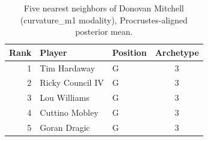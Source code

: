 \begin{table}[htbp]
  \centering\small
  \begin{tabular}{rllc}
    \toprule
    Rank & Player & Position & Archetype \\
    \midrule
    1 & Tim Hardaway & G & 3 \\
    2 & Ricky Council IV & G & 3 \\
    3 & Lou Williams & G & 3 \\
    4 & Cuttino Mobley & G & 3 \\
    5 & Goran Dragic & G & 3 \\
    \bottomrule
  \end{tabular}
  \caption{Five nearest neighbors of Donovan Mitchell (curvature_m1 modality), Procrustes-aligned posterior mean.}
  \label{tab:Donovan_Mitchell_neighbors_curvature_m1}
\end{table}


